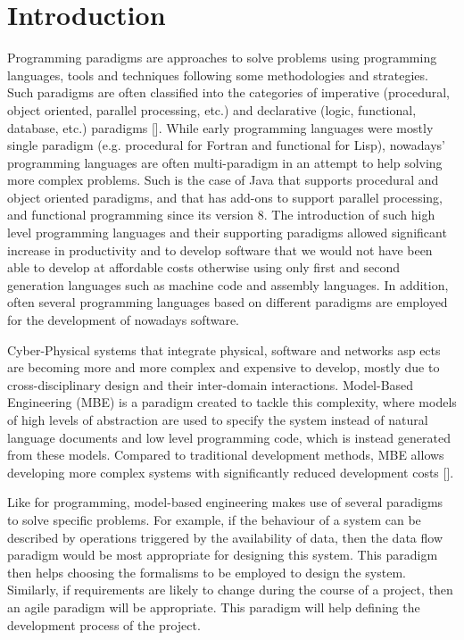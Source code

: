 \section{Introduction}
\label{sec:Introduction}

Programming paradigms are approaches to solve problems using programming languages, tools and techniques following some methodologies and strategies. Such paradigms are often classified into the categories of imperative (procedural, object oriented, parallel processing, etc.) and declarative (logic, functional, database, etc.) paradigms []. While early programming languages were mostly single paradigm (e.g. procedural for Fortran and functional for Lisp), nowadays’ programming languages are often multi-paradigm in an attempt to help solving more complex problems. Such is the case of Java that supports procedural and object oriented paradigms, and that has add-ons to support parallel processing, and functional programming since its version 8. The introduction of such high level programming languages and their supporting paradigms allowed significant increase in productivity and to develop software that we would not have been able to develop at affordable costs otherwise using only first and second generation languages such as machine code and assembly languages. In addition, often several programming languages based on different paradigms are employed for the development of nowadays software. 

Cyber-Physical systems that integrate physical, software and networks asp   ects are becoming more and more complex and expensive to develop, mostly due to cross-disciplinary design and their inter-domain interactions. Model-Based Engineering (MBE) is a paradigm created to tackle this complexity, where models of high levels of abstraction are used to specify the system instead of natural language documents and low level programming code, which is instead generated from these models. Compared to traditional development methods, MBE allows developing more complex systems with significantly reduced development costs [].

Like for programming, model-based engineering makes use of several paradigms to solve specific problems. For example, if the behaviour of a system can be described by operations triggered by the availability of data, then the data flow paradigm would be most appropriate for designing this system. This paradigm then helps choosing the formalisms to be employed to design the system. Similarly, if requirements are likely to change during the course of a project, then an agile paradigm will be appropriate. This paradigm will help defining the development process of the project. 


